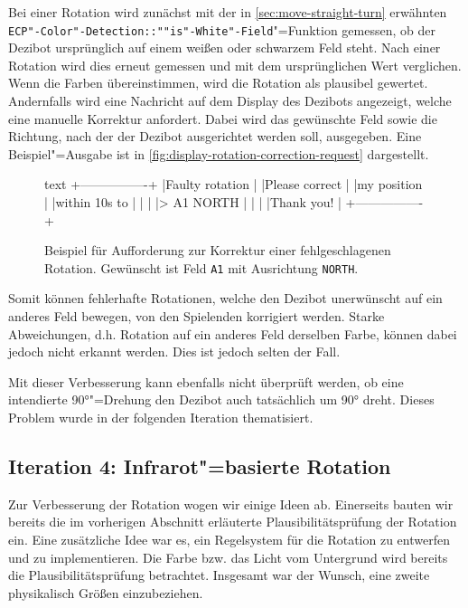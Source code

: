 Bei einer Rotation wird zunächst mit der in \autoref{sec:move-straight-turn} erwähnten \texttt{ECP"-Color"-Detection::""is"-White"-Field}"=Funktion gemessen, ob der Dezibot ursprünglich auf einem weißen oder schwarzem Feld steht. Nach einer Rotation wird dies erneut gemessen und mit dem ursprünglichen Wert verglichen. Wenn die Farben übereinstimmen, wird die Rotation als plausibel gewertet. Andernfalls wird eine Nachricht auf dem Display des Dezibots angezeigt, welche eine manuelle Korrektur anfordert. Dabei wird das gewünschte Feld sowie die Richtung, nach der der Dezibot ausgerichtet werden soll, ausgegeben. Eine Beispiel"=Ausgabe ist in \autoref{fig:display-rotation-correction-request} dargestellt.

\begin{figure}[h]
\centering
\begin{cminted}{text}
+----------------+
|Faulty rotation |
|Please correct  |
|my position     |
|within 10s to   |
|                |
|> A1 NORTH      |
|                |
|Thank you!      |
+----------------+
\end{cminted}
\caption{Beispiel für Aufforderung zur Korrektur einer fehlgeschlagenen Rotation. Gewünscht ist Feld \texttt{A1} mit Ausrichtung \texttt{NORTH}.}
\label{fig:display-rotation-correction-request}
\end{figure}

Somit können fehlerhafte Rotationen, welche den Dezibot unerwünscht auf ein anderes Feld bewegen, von den Spielenden korrigiert werden. Starke Abweichungen, d.h. Rotation auf ein anderes Feld derselben Farbe, können dabei jedoch nicht erkannt werden. Dies ist jedoch selten der Fall.

Mit dieser Verbesserung kann ebenfalls nicht überprüft werden, ob eine intendierte 90°"=Drehung den Dezibot auch tatsächlich um 90° dreht. Dieses Problem wurde in der folgenden Iteration thematisiert.


\subsection{Iteration 4: Infrarot"=basierte Rotation}
\label{sec:movement-ir}

Zur Verbesserung der Rotation wogen wir einige Ideen ab. Einerseits bauten wir bereits die im vorherigen Abschnitt erläuterte Plausibilitätsprüfung der Rotation ein. Eine zusätzliche Idee war es, ein Regelsystem für die Rotation zu entwerfen und zu implementieren. Die Farbe bzw. das Licht vom Untergrund wird bereits die Plausibilitätsprüfung betrachtet. Insgesamt war der Wunsch, eine zweite physikalisch Größen einzubeziehen.

